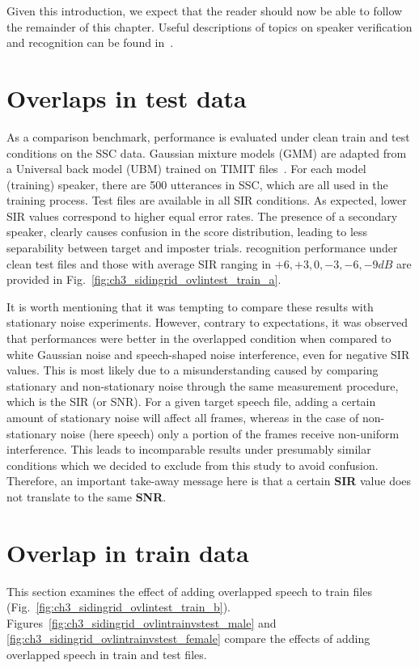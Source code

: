 Given this introduction, we expect that the reader should now be able to follow the remainder of this chapter. 
Useful descriptions of topics on speaker verification and recognition can be found in~\cite{hansen2015SIDmagazine}. 


\section{Overlaps in test data}
\label{sec:ch3_OvlinTest}
As a comparison benchmark, performance is evaluated under clean train and test conditions on the SSC data. 
Gaussian mixture models (GMM) are adapted from a Universal back model (UBM) trained on TIMIT files~\cite{msridentity}. 
For each model (training) speaker, there are 500 utterances in SSC, which are all used in the training process. Test files are available in all SIR conditions. 
As expected, lower SIR values correspond to higher equal error rates. 
The presence of a secondary speaker, clearly causes confusion in the score distribution, leading to less separability between target and imposter trials. 
recognition performance under clean test files and those with average SIR ranging in $+6, +3, 0, -3, -6, -9 dB$ are provided in Fig.~\ref{fig:ch3_sidingrid_ovlintest_train_a}. 

It is worth mentioning that it was tempting to compare these results with stationary noise experiments. 
However, contrary to expectations, it was observed that performances were better in the overlapped condition when compared to white Gaussian noise and speech-shaped noise interference, even for negative SIR values. 
This is most likely due to a misunderstanding caused by comparing stationary and non-stationary noise through the same measurement procedure, which is the SIR (or SNR). 
For a given target speech file, adding a certain amount of stationary noise will affect all frames, whereas in the case of non-stationary noise (here speech) only a portion of the frames receive non-uniform interference. 
This leads to incomparable results under presumably similar conditions which we decided to exclude from this study to avoid confusion. 
Therefore, an important take-away message here is that a certain {\bf SIR} value does not translate to the same {\bf SNR}. 


\section{Overlap in train data}
\label{sec:ch3_OvlinTrain}
This section examines the effect of adding overlapped speech to train files (Fig.~\ref{fig:ch3_sidingrid_ovlintest_train_b}). 
Figures~\ref{fig:ch3_sidingrid_ovlintrainvstest_male} and \ref{fig:ch3_sidingrid_ovlintrainvstest_female} compare the effects of adding overlapped speech in train and test files. 

